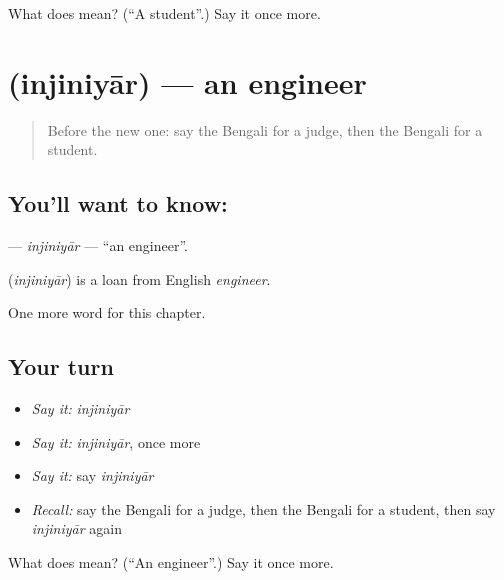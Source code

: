 \begin{tcolorbox}[breakable,colback=teal!4,colframe=teal!35!black,title={Before you move on}]
What does  mean? (\textquotedblleft{}A student\textquotedblright{}.) Say it once more.
\end{tcolorbox}
\section[\texorpdfstring{\bn{ইঞ্জিনিয়ার} (injiniyār)}{ইঞ্জিনিয়ার (injiniyār)}]{ (injiniyār) — an engineer}

\label{lesson:BN-C177-injiniyar}



\begin{quote}
Before the new one: say the Bengali for a judge, then the Bengali for a student.
\end{quote}

\subsection*{You'll want to know: }
\textbf{} — \emph{injiniyār} — \textquotedblleft{}an engineer\textquotedblright{}.

\begin{cousinweb}
\textbf{} (\emph{injiniyār}) is a loan from English \emph{engineer}.
\end{cousinweb}

\begin{grammarlens}[title={What you've built}]
One more word for this chapter.
\end{grammarlens}

\subsection*{Your turn}
\begin{itemize}
\raggedright
  \item \emph{Say it:} \emph{injiniyār}
  \item \emph{Say it:} \emph{injiniyār}, once more
  \item \emph{Say it:} say \emph{injiniyār}
  \item \emph{Recall:} say the Bengali for a judge, then the Bengali for a student, then say \emph{injiniyār} again
\end{itemize}

\begin{tcolorbox}[breakable,colback=teal!4,colframe=teal!35!black,title={Before you move on}]
What does  mean? (\textquotedblleft{}An engineer\textquotedblright{}.) Say it once more.
\end{tcolorbox}
